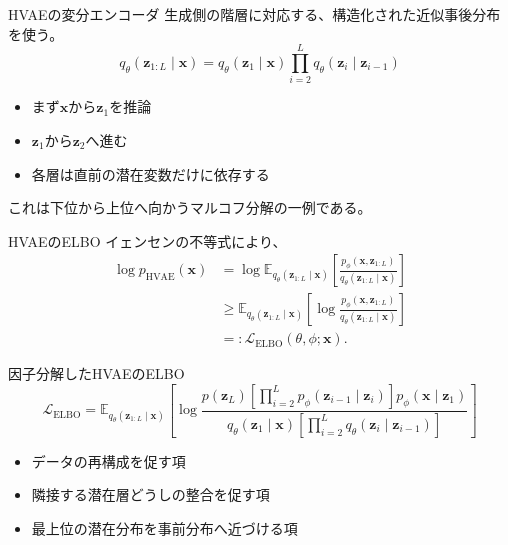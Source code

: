 \begin{frame}{HVAEの変分エンコーダ}
    生成側の階層に対応する、構造化された近似事後分布を使う。
    \[
        \boxed{
        q_\theta(\boldsymbol{z}_{1:L}\mid\boldsymbol{x})
        =
        q_\theta(\boldsymbol{z}_1\mid\boldsymbol{x})
        \prod_{i=2}^{L}
        q_\theta(\boldsymbol{z}_i\mid\boldsymbol{z}_{i-1})
        }
    \]
    \begin{itemize}
        \item まず$\boldsymbol{x}$から$\boldsymbol{z}_1$を推論
        \item $\boldsymbol{z}_1$から$\boldsymbol{z}_2$へ進む
        \item 各層は直前の潜在変数だけに依存する
    \end{itemize}
    これは下位から上位へ向かうマルコフ分解の一例である。
\end{frame}
\begin{frame}{HVAEのELBO}
    \small
    イェンセンの不等式により、
    \begin{align*}
        \log p_{\mathrm{HVAE}}(\boldsymbol{x})
        &=
        \log\mathbb{E}_{q_\theta(\boldsymbol{z}_{1:L}\mid\boldsymbol{x})}
        \left[
        \frac{
        p_\phi(\boldsymbol{x},\boldsymbol{z}_{1:L})
        }{
        q_\theta(\boldsymbol{z}_{1:L}\mid\boldsymbol{x})
        }
        \right]\\
        &\geq
        \mathbb{E}_{q_\theta(\boldsymbol{z}_{1:L}\mid\boldsymbol{x})}
        \left[
        \log
        \frac{
        p_\phi(\boldsymbol{x},\boldsymbol{z}_{1:L})
        }{
        q_\theta(\boldsymbol{z}_{1:L}\mid\boldsymbol{x})
        }
        \right]\\
        &=:\mathcal{L}_{\mathrm{ELBO}}(\theta,\phi;\boldsymbol{x}).
    \end{align*}
\end{frame}
\begin{frame}{因子分解したHVAEのELBO}
    \scriptsize
    \[
        \boxed{
        \mathcal{L}_{\mathrm{ELBO}}
        =
        \mathbb{E}_{q_\theta(\boldsymbol{z}_{1:L}\mid\boldsymbol{x})}
        \left[
        \log
        \frac{
        p(\boldsymbol{z}_L)
        \left[\prod_{i=2}^{L}
        p_\phi(\boldsymbol{z}_{i-1}\mid\boldsymbol{z}_i)\right]
        p_\phi(\boldsymbol{x}\mid\boldsymbol{z}_1)
        }{
        q_\theta(\boldsymbol{z}_1\mid\boldsymbol{x})
        \left[\prod_{i=2}^{L}
        q_\theta(\boldsymbol{z}_i\mid\boldsymbol{z}_{i-1})\right]
        }
        \right]
        }
        \tag{2.1.3}
    \]
    \normalsize
    \begin{itemize}
        \item データの再構成を促す項
        \item 隣接する潜在層どうしの整合を促す項
        \item 最上位の潜在分布を事前分布へ近づける項
    \end{itemize}
\end{frame}
